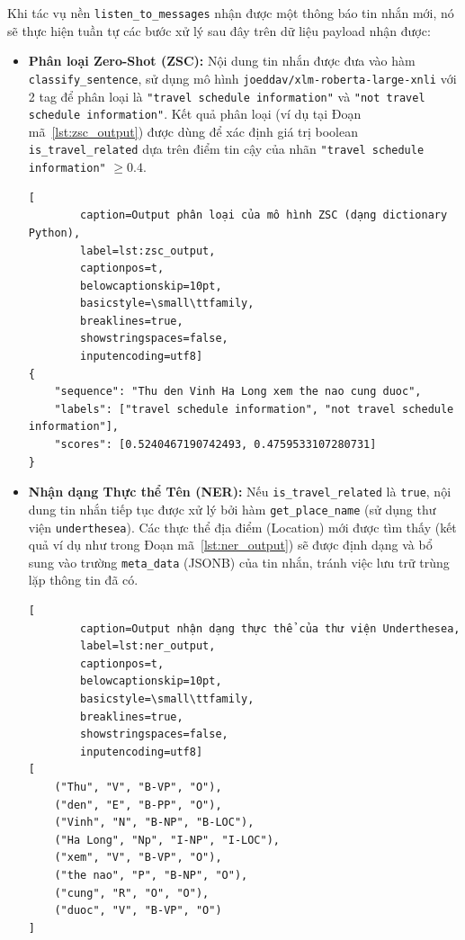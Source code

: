 \begin{enumerate}
\noindent Khi tác vụ nền \texttt{listen\_to\_messages} nhận được một thông báo tin nhắn mới, nó sẽ thực hiện tuần tự các bước xử lý sau đây trên dữ liệu payload nhận được:
\begin{itemize}
    \item \textbf{Phân loại Zero-Shot (ZSC):} Nội dung tin nhắn được đưa vào hàm \texttt{classify\_sentence}, sử dụng mô hình \texttt{joeddav/xlm-roberta-large-xnli} với 2 tag để phân loại là \texttt{"travel schedule information"} và \texttt{"not travel schedule information"}. Kết quả phân loại (ví dụ tại Đoạn mã~\ref{lst:zsc_output}) được dùng để xác định giá trị boolean \texttt{is\_travel\_related} dựa trên điểm tin cậy của nhãn \texttt{"travel schedule information"} $\geq 0.4$.
    \lstset{language=json}
    \begin{lstlisting}[
        caption=Output phân loại của mô hình ZSC (dạng dictionary Python),
        label=lst:zsc_output,
        captionpos=t,
        belowcaptionskip=10pt,
        basicstyle=\small\ttfamily,
        breaklines=true,
        showstringspaces=false,
        inputencoding=utf8] 
{
    "sequence": "Thu den Vinh Ha Long xem the nao cung duoc",
    "labels": ["travel schedule information", "not travel schedule information"],
    "scores": [0.5240467190742493, 0.4759533107280731]
}
    \end{lstlisting}
    \item \textbf{Nhận dạng Thực thể Tên (NER):} Nếu \texttt{is\_travel\_related} là \texttt{true}, nội dung tin nhắn tiếp tục được xử lý bởi hàm \texttt{get\_place\_name} (sử dụng thư viện \texttt{underthesea}). Các thực thể địa điểm (Location) mới được tìm thấy (kết quả ví dụ như trong Đoạn mã~\ref{lst:ner_output}) sẽ được định dạng và bổ sung vào trường \texttt{meta\_data} (JSONB) của tin nhắn, tránh việc lưu trữ trùng lặp thông tin đã có.
    \newpage
    \lstset{language=Python}
    \begin{lstlisting}[
        caption=Output nhận dạng thực thể của thư viện Underthesea,
        label=lst:ner_output, 
        captionpos=t,
        belowcaptionskip=10pt,
        basicstyle=\small\ttfamily,
        breaklines=true,
        showstringspaces=false,
        inputencoding=utf8] 
[
    ("Thu", "V", "B-VP", "O"), 
    ("den", "E", "B-PP", "O"),
    ("Vinh", "N", "B-NP", "B-LOC"),
    ("Ha Long", "Np", "I-NP", "I-LOC"), 
    ("xem", "V", "B-VP", "O"),
    ("the nao", "P", "B-NP", "O"),
    ("cung", "R", "O", "O"),
    ("duoc", "V", "B-VP", "O")
]
    \end{lstlisting}


\end{itemize}
\end{enumerate}
